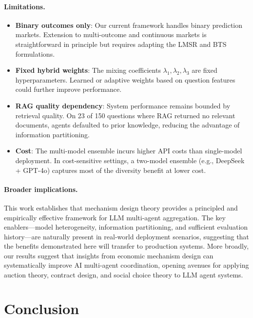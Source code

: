 \documentclass[conference]{IEEEtran}
\begin{document}
\paragraph{Limitations.}
\begin{itemize}
    \item \textbf{Binary outcomes only}: Our current framework handles binary prediction markets. Extension to multi-outcome and continuous markets is straightforward in principle but requires adapting the LMSR and BTS formulations.
    \item \textbf{Fixed hybrid weights}: The mixing coefficients $\lambda_1, \lambda_2, \lambda_3$ are fixed hyperparameters. Learned or adaptive weights based on question features could further improve performance.
    \item \textbf{RAG quality dependency}: System performance remains bounded by retrieval quality. On 23 of 150 questions where RAG returned no relevant documents, agents defaulted to prior knowledge, reducing the advantage of information partitioning.
    \item \textbf{Cost}: The multi-model ensemble incurs higher API costs than single-model deployment. In cost-sensitive settings, a two-model ensemble (e.g., DeepSeek + GPT-4o) captures most of the diversity benefit at lower cost.
\end{itemize}

\paragraph{Broader implications.}
This work establishes that mechanism design theory provides a principled and empirically effective framework for LLM multi-agent aggregation. The key enablers---model heterogeneity, information partitioning, and sufficient evaluation history---are naturally present in real-world deployment scenarios, suggesting that the benefits demonstrated here will transfer to production systems. More broadly, our results suggest that insights from economic mechanism design can systematically improve AI multi-agent coordination, opening avenues for applying auction theory, contract design, and social choice theory to LLM agent systems.


\section{Conclusion}
\label{sec:conclusion}
\end{document}
